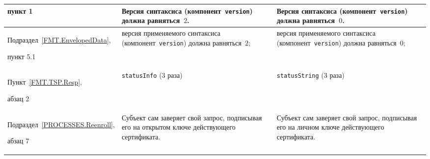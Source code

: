 {\begin{center}
\begin{tabular}{|p{3cm}|p{6.3cm}|p{6.4cm}|}
пункт 1
&
Версия синтаксиса (компонент~\texttt{version}) должна равняться~$2$. 
&
Версия синтаксиса (компонент~\texttt{version}) должна равняться~$0$. 
\\
\hline
Подраздел~\ref{FMT.EnvelopedData},\par 
пункт 5.1
&
версия применяемого синтаксиса (компонент~\texttt{version}) должна 
равняться~$2$;
&
версия применяемого синтаксиса (компонент~\texttt{version}) должна 
равняться~$0$;
\\
\hline
Пункт~\ref{FMT.TSP.Resp},\par
абзац 2 
&
\texttt{statusInfo} (3 раза)
&
\texttt{statusString} (3 раза)
\\
\hline
Подраздел~\ref{PROCESSES.Reenroll},\par 
абзац 7
&
Субъект сам заверяет свой запрос, подписывая его на открытом ключе 
действующего сертификата.
&
Субъект сам заверяет свой запрос, подписывая его на личном ключе 
действующего сертификата.
\\
\hline
\end{tabular}
\end{center}
}